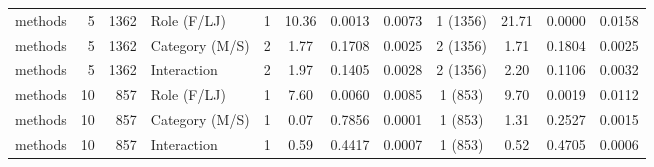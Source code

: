 \begin{table}[H]
{\begin{tabular}{l r r l ccc r ccc r}
methods & 5 & 1362 & Role (F/LJ) & 1 & 10.36 & 0.0013 & 0.0073 & 1 (1356) & 21.71 & 0.0000 & 0.0158 \\ 
methods & 5 & 1362 & Category (M/S) & 2 & 1.77 & 0.1708 & 0.0025 & 2 (1356) & 1.71 & 0.1804 & 0.0025 \\ 
methods & 5 & 1362 & Interaction & 2 & 1.97 & 0.1405 & 0.0028 & 2 (1356) & 2.20 & 0.1106 & 0.0032 \\ 
methods & 10 & 857 & Role (F/LJ) & 1 & 7.60 & 0.0060 & 0.0085 & 1 (853) & 9.70 & 0.0019 & 0.0112 \\ 
methods & 10 & 857 & Category (M/S) & 1 & 0.07 & 0.7856 & 0.0001 & 1 (853) & 1.31 & 0.2527 & 0.0015 \\ 
methods & 10 & 857 & Interaction & 1 & 0.59 & 0.4417 & 0.0007 & 1 (853) & 0.52 & 0.4705 & 0.0006 \\ 
\bottomrule
\end{tabular}%
} 
\end{table}
\newpage 
